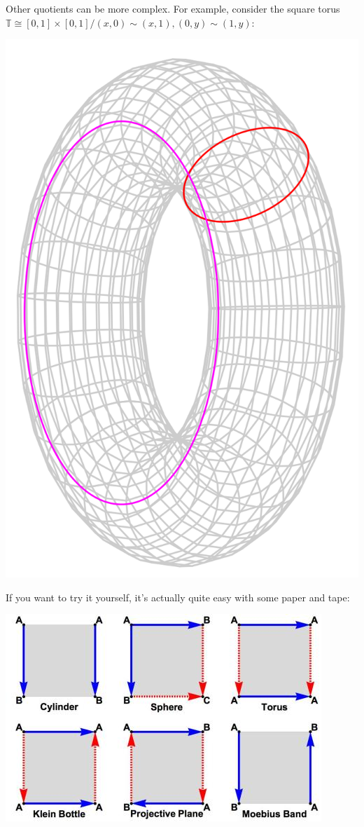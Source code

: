 \documentclass[tikz]{beamer}
\theoremstyle{definition}
\begin{document}
\frame
{
	Other quotients can be more complex. For example, consider the square torus $\mathbb{T}  \cong [0,1] \times [0,1] / (x,0) \sim (x,1), (0, y) \sim (1, y)$: 
	
	\begin{center}
		\includegraphics[scale=0.1]{torus_skeleton}
	\end{center}
	 
}

\frame
{
	If you want to try it yourself, it's actually quite easy with some paper and tape: 
	
	\begin{center}
		\includegraphics[scale=0.4]{identification_spaces}
	\end{center}
	 
}
\end{document}
